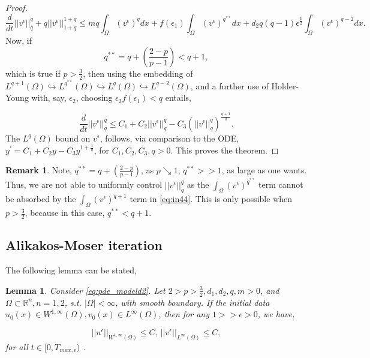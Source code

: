 \documentclass[10pt]{amsart}
\theoremstyle{plain}
\newtheorem{lemma}[theorem]{Lemma}
\theoremstyle{definition}
\newtheorem{remark}{Remark}
\begin{document}
\begin{proof}
\begin{equation}
\label{eq:in44}
 \frac{d}{dt}||v^{\epsilon}||^{q}_{q} 
+q||v^{\epsilon}||^{1+q}_{1+q} 
 \leq mq\int_{\Omega} (v^{\epsilon})^{q}dx +  f(\epsilon_{1})\int_{\Omega} (v^{\epsilon})^{q^{**}}dx + d_{2}  q(q-1) \epsilon^{\frac{p}{2}}\int_{\Omega} (v^{\epsilon})^{q-2} dx.
\end{equation}
Now, if 
\begin{equation}
    q^{**} = q + \left(\frac{2-p}{p-1}\right) < q+1, 
\end{equation} 
which is true if $p > \frac{3}{2}$,  then using the embedding of $L^{q+1}(\Omega) \hookrightarrow L^{q^{**}}(\Omega) \hookrightarrow L^{q}(\Omega) \hookrightarrow L^{q-2}(\Omega)$, and a further use of Holder-Young with, say, $\epsilon_{2}$, choosing $\epsilon_{2} f(\epsilon_{1}) < q$ entails,




\begin{equation}
 \frac{d}{dt}||v^{\epsilon}||^{q}_{q} \leq  C_{1} + C_{2}||v^{\epsilon}||^{q}_{q}
-C_{3}\left(||v^{\epsilon}||^{q}_{q}\right)^{\frac{q+1}{q}}.
\end{equation}
%
The $L^{q}(\Omega)$ bound on $v^{\epsilon}$, follows, via comparison to the ODE, $y^{'}=C_{1} + C_{2}y - C_{3}y^{1+\frac{1}{q}}$, for $C_{1}, C_{2}, C_{3}, q > 0$.
This proves the theorem.




\end{proof}
\begin{remark}
    Note,  $\boxed{q^{**}=q + \left(\frac{2-p}{p-1}\right)}$, as $p \searrow 1$, $q^{**} >>1$, as large as one wants. Thus, we are not able to uniformly control
    $||v^{\epsilon}||^{q}_{q}$ as the $\int_{\Omega}(v^{\epsilon})^{q^{**}}$ term cannot be absorbed by the 
    $\int_{\Omega}(v^{\epsilon})^{q+1}$ term in \eqref{eq:in44}. This is only possible when $p > \frac{3}{2}$, because in this case, $q^{**} < q+1$.
\end{remark}








\subsection{Alikakos-Moser iteration}

The following lemma can be stated,

\begin{lemma}
\label{lem:ma1}
Consider \eqref{eq:pde_modeld2}. Let $2>p>\frac{3}{2}, d_{1}, d_{2}, q,m>0$, and $\Omega \subset \mathbb{R}^{n}, n=1,2$, s.t. $|\Omega| < \infty$, with smooth boundary. If the initial data $u_{0}(x) \in W^{1,\infty}(\Omega), v_{0}(x) \in L^{\infty}(\Omega)$, then for any $1>>\epsilon > 0$, we have,

\begin{equation}
    ||u^{\epsilon}||_{W^{1,\infty}(\Omega)} \leq C, \ ||v^{\epsilon}||_{L^{\infty}(\Omega)} \leq C,
\end{equation}
for all $t \in [0, T_{max, \epsilon})$  .
\end{lemma}
\end{document}
